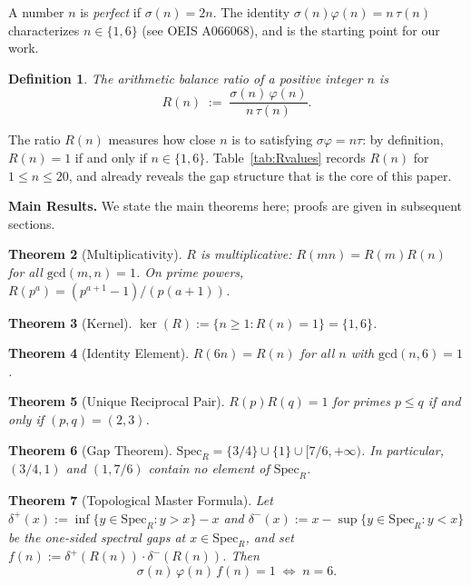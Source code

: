 \documentclass[12pt]{article}
\newtheorem{theorem}{Theorem}[section]
\newtheorem{definition}[theorem]{Definition}
\newcommand{\SpecR}{\mathrm{Spec}_R}
\newcommand{\gcd}{\mathrm{gcd}}
\begin{document}
A number $n$ is \emph{perfect} if $\sigma(n)=2n$.  The identity
$\sigma(n)\varphi(n)=n\,\tau(n)$ characterizes $n\in\{1,6\}$ (see
OEIS A066068), and is the starting point for our work.

\begin{definition}
The \emph{arithmetic balance ratio} of a positive integer $n$ is
\[
  R(n) \;:=\; \frac{\sigma(n)\,\varphi(n)}{n\,\tau(n)}.
\]
\end{definition}

The ratio $R(n)$ measures how close $n$ is to satisfying $\sigma\varphi=n\tau$:
by definition, $R(n)=1$ if and only if $n\in\{1,6\}$.  Table~\ref{tab:Rvalues}
records $R(n)$ for $1\le n\le 20$, and already reveals the gap structure that
is the core of this paper.

\medskip
\noindent\textbf{Main Results.}
We state the main theorems here; proofs are given in subsequent sections.

\begin{theorem}[Multiplicativity]\label{thm:A}
$R$ is multiplicative: $R(mn)=R(m)R(n)$ for all $\gcd(m,n)=1$.
On prime powers, $R(p^a)=(p^{a+1}-1)/(p(a+1))$.
\end{theorem}

\begin{theorem}[Kernel]\label{thm:C}
$\ker(R):=\{n\ge 1 : R(n)=1\} = \{1,6\}$.
\end{theorem}

\begin{theorem}[Identity Element]\label{thm:D}
$R(6n)=R(n)$ for all $n$ with $\gcd(n,6)=1$.
\end{theorem}

\begin{theorem}[Unique Reciprocal Pair]\label{thm:E}
$R(p)R(q)=1$ for primes $p\le q$ if and only if $(p,q)=(2,3)$.
\end{theorem}

\begin{theorem}[Gap Theorem]\label{thm:F}
$\SpecR = \{3/4\}\cup\{1\}\cup[7/6,+\infty)$.
In particular, $(3/4,1)$ and $(1,7/6)$ contain no element of $\SpecR$.
\end{theorem}

\begin{theorem}[Topological Master Formula]\label{thm:I}
Let $\delta^+(x):=\inf\{y\in\SpecR : y>x\}-x$ and
$\delta^-(x):=x-\sup\{y\in\SpecR : y<x\}$ be the one-sided spectral gaps at
$x\in\SpecR$, and set $f(n):=\delta^+(R(n))\cdot\delta^-(R(n))$.  Then
\[
  \sigma(n)\,\varphi(n)\,f(n) = 1 \;\iff\; n = 6.
\]
\end{theorem}
\end{document}
